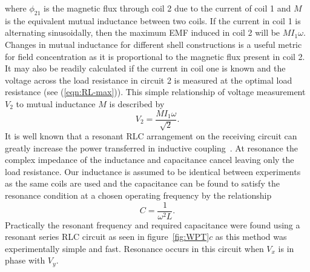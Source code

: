 \documentclass[11pt]{iopart}
\begin{document}
where $\phi_{21}$ is the magnetic flux through coil 2 due to the
current of coil 1 and $M$ is the equivalent mutual inductance between
two coils.
If the current in coil 1 is alternating sinusoidally, then the
maximum EMF induced in coil 2 will be $M I_1 \omega$. Changes in
mutual inductance for different shell constructions is a useful metric
for field concentration as it is proportional to the magnetic flux
present in coil 2. It may also be readily calculated if the current in
coil one is known and the voltage across the load resistance in
circuit 2 is measured at the optimal load resistance
(see (\ref{eqn:RL-max})). This simple relationship of voltage
measurement $V_2$ to mutual inductance $M$ is described by
\begin{equation}
  V_2 = \frac{MI_1\omega}{\sqrt{2}}.
\label{eqn:MVs}
\end{equation}
It is well known that a resonant RLC arrangement on the receiving
circuit can greatly increase the power transferred in inductive
coupling~\cite{Hirai2000}.  At resonance the complex impedance of the inductance
and capacitance cancel leaving only the load resistance. Our
inductance is assumed to be identical between experiments as the same
coils are used and the capacitance can be found to satisfy the
resonance condition at a chosen operating frequency by the
relationship
\begin{equation}
  C = \frac{1}{\omega^2L}.
  \label{eqn:RLC-res}
\end{equation}
Practically the resonant frequency and required capacitance were found
using a resonant series RLC circuit as seen in
figure~\ref{fig:WPT}$c$ as this method was experimentally
simple and fast. Resonance occurs in this circuit when $V_x$ is in phase with
$V_y$.
\end{document}
